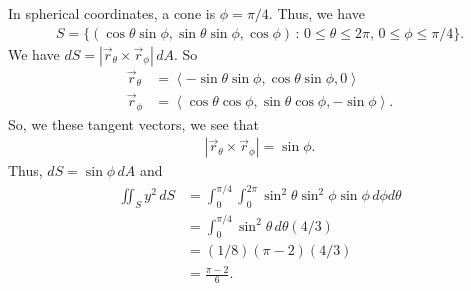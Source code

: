 	\spc
	
	In spherical coordinates, a cone is $\phi = \pi/4$. Thus, we have
		\begin{align*}
		S = \{ (\cos \theta \sin \phi , \sin \theta \sin \phi , \cos \phi ) \, : \, 0 \leq \theta \leq 2\pi \text{, } 0 \leq \phi \leq \pi/4 \} .
		\end{align*}
	We have $dS = |\vec{r}_\theta \times \vec{r}_\phi | \, dA$. So
		\begin{align*}
		\vec{r}_\theta &= \left\langle -\sin \theta \sin \phi , \cos \theta \sin \phi , 0 \right\rangle  \\
		\vec{r}_\phi &= \left\langle \cos \theta \cos \phi , \sin \theta \cos \phi , -\sin \phi \right\rangle .
		\end{align*}
	So, we these tangent vectors, we see that
		\begin{align*}
		|\vec{r}_\theta \times \vec{r}_\phi | = \sin \phi .
		\end{align*}
	Thus, $dS = \sin \phi \, dA$ and
		\begin{align*}
		\iint_S y^2 \, dS &= \int_0^{\pi/4} \int_0^{2\pi} \sin^2 \theta \sin^2 \phi \sin \phi \, d\phi d\theta \\
		&= \int_0^{\pi/4} \sin^2 \theta \, d\theta (4/3) \\
		&= (1/8)(\pi - 2) (4/3) \\
		&= \frac{\pi - 2}{6} .
		\end{align*}
		
	\spc
	
